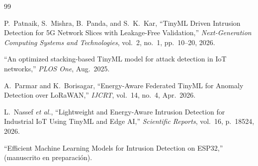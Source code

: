 \documentclass[12pt,a4paper]{article}
\begin{document}
\begin{thebibliography}{99}

P.~Patnaik, S.~Mishra, B.~Panda, and S.~K.~Kar,
``TinyML Driven Intrusion Detection for 5G Network Slices with Leakage-Free Validation,''
\textit{Next-Generation Computing Systems and Technologies}, vol.~2, no.~1, pp.~10--20, 2026.

``An optimized stacking-based TinyML model for attack detection in IoT networks,''
\textit{PLOS One}, Aug.~2025.

A.~Parmar and K.~Borisagar,
``Energy-Aware Federated TinyML for Anomaly Detection over LoRaWAN,''
\textit{IJCRT}, vol.~14, no.~4, Apr.~2026.

L.~Nassef \textit{et al.},
``Lightweight and Energy-Aware Intrusion Detection for Industrial IoT Using TinyML and Edge AI,''
\textit{Scientific Reports}, vol.~16, p.~18524, 2026.

``Efficient Machine Learning Models for Intrusion Detection on ESP32,''
(manuscrito en preparación).

\end{thebibliography}
\end{document}

